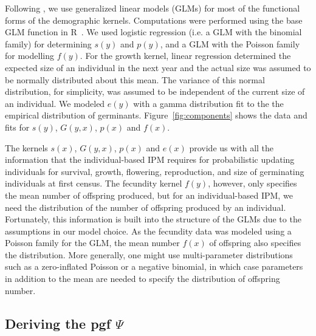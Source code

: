 \documentclass[12pt]{amsart}\usepackage[]{graphicx}\usepackage[]{color}
\begin{document}
Following \citet{salguero-etal-12}, we use generalized linear models (GLMs) for most of the functional forms of the demographic kernels. Computations were performed using the base GLM function in R~\citep{R-15}. We used logistic regression (i.e. a GLM with the binomial family) for determining $s(y)$ and $p(y)$, and a GLM with the Poisson family for modelling $f(y)$.  For the growth kernel, linear regression determined the expected size of an individual in the next year and the actual size was assumed to be normally distributed about this mean. The variance of this normal distribution, for simplicity, was assumed to be independent of the current size of an individual. We modeled $e(y)$ with a gamma distribution fit to the the empirical distribution of germinants. Figure~\ref{fig:components} shows the data and fits for $s(y)$, $G(y, x)$, $p(x)$ and $f(x)$.

The kernels $s(x)$, $G(y, x)$, $p(x)$ and $e(x)$ provide us with all the information that the individual-based IPM requires for probabilistic updating individuals for survival, growth, flowering, reproduction, and size of germinating individuals at first census. The fecundity kernel $f(y)$, however, only specifies the mean number of offspring produced, but for an individual-based IPM, we need the distribution of the number of offspring produced by an individual. Fortunately, this information is built into the structure of the GLMs due to the assumptions in our model choice. As the fecundity data was modeled using a Poisson family for the GLM, the mean number $f(x)$ of offspring also specifies the distribution. More generally, one might use multi-parameter distributions such as a zero-inflated Poisson or a negative binomial, in which case parameters in addition to the mean are needed to specify the distribution of offspring number.

\subsection*{Deriving the pgf $\Psi$}
\end{document}
